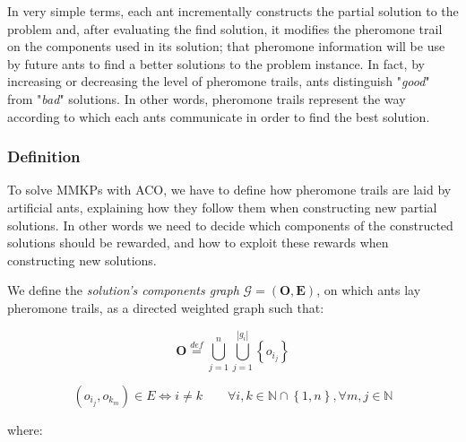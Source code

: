 \documentclass[12pt,a4paper]{report}
\newcommand{\mathDef}{\overset{\textit{def}}{=}}
\newcommand{\N}{\mathbb{N}}
\begin{document}
In very simple terms, each ant incrementally constructs the partial solution to the problem and, after evaluating the find solution, it modifies the pheromone trail on the components used in its solution; that pheromone information will be use by future ants to find a better solutions to the problem instance. In fact, by increasing or decreasing the level of pheromone trails, ants distinguish "\textit{good}" from "\textit{bad}" solutions. In other words, pheromone trails represent the way according to which each ants communicate in order to find the best solution.
 
\subsubsection{Definition}

To solve MMKPs with ACO, we have to define how pheromone trails are laid by artificial ants, explaining how they follow them when constructing new partial solutions. In other words we need to decide which components of the constructed solutions should be rewarded, and how to exploit these rewards when constructing new solutions.

We define the \textit{solution's components graph} $\mathcal{G}=(\textbf{O},\textbf{E})$, on which ants lay pheromone trails, as a directed weighted graph such that:

\begin{equation}
	\textbf{O} \mathDef \bigcup_{j=1}^n \bigcup_{j=1}^{|g_i|} \left\{ o_{i_j} \right\}
\end{equation}

\begin{equation}
	(o_{i_j}, o_{k_m}) \in E \Leftrightarrow i \neq k \qquad \forall i,k \in \N \cap \left\{1,n\right\}, \forall m,j \in \N
\end{equation}

where: 
\end{document}
